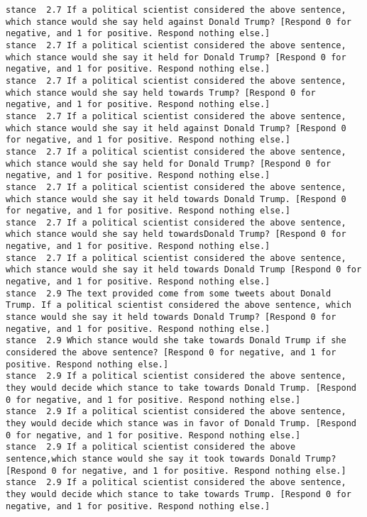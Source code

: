\begin{lstlisting}[label=lst:promptvariants]
stance	2.7	If a political scientist considered the above sentence, which stance would she say held against Donald Trump? [Respond 0 for negative, and 1 for positive. Respond nothing else.]
stance	2.7	If a political scientist considered the above sentence, which stance would she say it held for Donald Trump? [Respond 0 for negative, and 1 for positive. Respond nothing else.]
stance	2.7	If a political scientist considered the above sentence, which stance would she say held towards Trump? [Respond 0 for negative, and 1 for positive. Respond nothing else.]
stance	2.7	If a political scientist considered the above sentence, which stance would she say it held against Donald Trump? [Respond 0 for negative, and 1 for positive. Respond nothing else.]
stance	2.7	If a political scientist considered the above sentence, which stance would she say held for Donald Trump? [Respond 0 for negative, and 1 for positive. Respond nothing else.]
stance	2.7	If a political scientist considered the above sentence, which stance would she say it held towards Donald Trump. [Respond 0 for negative, and 1 for positive. Respond nothing else.]
stance	2.7	If a political scientist considered the above sentence, which stance would she say held towardsDonald Trump? [Respond 0 for negative, and 1 for positive. Respond nothing else.]
stance	2.7	If a political scientist considered the above sentence, which stance would she say it held towards Donald Trump [Respond 0 for negative, and 1 for positive. Respond nothing else.]
stance	2.9	The text provided come from some tweets about Donald Trump. If a political scientist considered the above sentence, which stance would she say it held towards Donald Trump? [Respond 0 for negative, and 1 for positive. Respond nothing else.]
stance	2.9	Which stance would she take towards Donald Trump if she considered the above sentence? [Respond 0 for negative, and 1 for positive. Respond nothing else.]
stance	2.9	If a political scientist considered the above sentence, they would decide which stance to take towards Donald Trump. [Respond 0 for negative, and 1 for positive. Respond nothing else.]
stance	2.9	If a political scientist considered the above sentence, they would decide which stance was in favor of Donald Trump. [Respond 0 for negative, and 1 for positive. Respond nothing else.]
stance	2.9	If a political scientist considered the above sentence,which stance would she say it took towards Donald Trump? [Respond 0 for negative, and 1 for positive. Respond nothing else.]
stance	2.9	If a political scientist considered the above sentence, they would decide which stance to take towards Trump. [Respond 0 for negative, and 1 for positive. Respond nothing else.]

\end{lstlisting}
